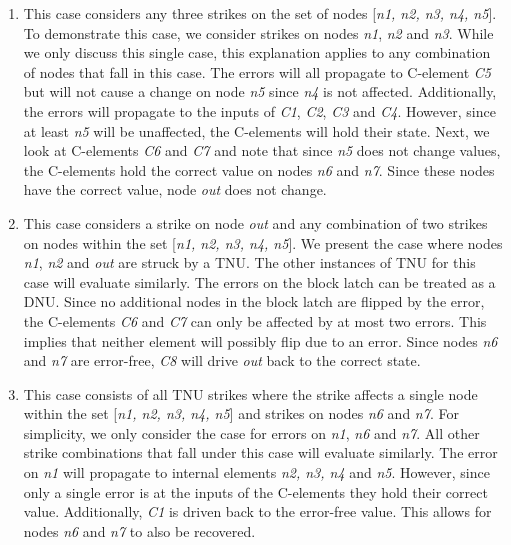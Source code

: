 \begin{enumerate}
	\item This case considers any three strikes on the set of nodes [\textit{n1, n2, n3, n4, n5}]. To demonstrate this case, we consider strikes on nodes \textit{n1}, \textit{n2} and \textit{n3}. While we only discuss this single case, this explanation applies to any combination of nodes that fall in this case. The errors will all propagate to C-element \textit{C5} but will not cause a change on node \textit{n5} since \textit{n4} is not affected. Additionally, the errors will propagate to the inputs of \textit{C1}, \textit{C2}, \textit{C3} and \textit{C4}. However, since at least \textit{n5} will be unaffected, the C-elements will hold their state. Next, we look at C-elements \textit{C6} and \textit{C7} and note that since \textit{n5} does not change values, the C-elements hold the correct value on nodes \textit{n6} and \textit{n7}. Since these nodes have the correct value, node \textit{out} does not change.
	
	\item This case considers a strike on node \textit{out} and any combination of two strikes on nodes within the set [\textit{n1, n2, n3, n4, n5}]. We present the case where nodes \textit{n1}, \textit{n2} and \textit{out} are struck by a TNU. The other instances of TNU for this case will evaluate similarly. The errors on the block latch can be treated as a DNU. Since no additional nodes in the block latch are flipped by the error, the C-elements \textit{C6} and \textit{C7} can only be affected by at most two errors. This implies that neither element will possibly flip due to an error. Since nodes \textit{n6} and \textit{n7} are error-free, \textit{C8} will drive \textit{out} back to the correct state.
	
	\item This case consists of all TNU strikes where the strike affects a single node within the set [\textit{n1, n2, n3, n4, n5}] and strikes on nodes \textit{n6} and \textit{n7}. For simplicity, we only consider the case for errors on \textit{n1}, \textit{n6} and \textit{n7}. All other strike combinations that fall under this case will evaluate similarly. The error on \textit{n1} will propagate to internal elements \textit{n2, n3, n4} and \textit{n5}. However, since only a single error is at the inputs of the C-elements they hold their correct value. Additionally, \textit{C1} is driven back to the error-free value. This allows for nodes \textit{n6} and \textit{n7} to also be recovered. 
	

\end{enumerate}
